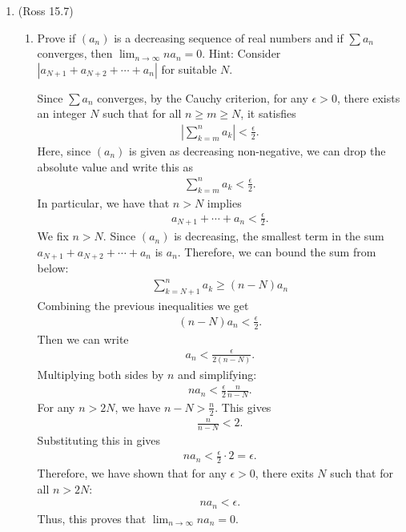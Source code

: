 \documentclass [10pt]{article}
\newcommand{\jg}[1]{{\color{blue} #1}}
\begin{document}
\begin{enumerate}
\begin{enumerate}
{}

\end{enumerate}
\clearpage

\item (Ross 15.7)
\begin{enumerate}
\item Prove if $(a_n)$ is a decreasing sequence of real numbers and if $\sum
a_n$ converges, then $\lim_{n \to \infty} n a_n=0.$ Hint: Consider $|a_{N+1}+a_{N+2}+ \cdots + a_n|$ for suitable $N$.

\jg{
Since $\sum a_n$ converges, by the Cauchy criterion, for any $\epsilon > 0$, there exists an integer $N$ such that for all $n \geq m \geq N$, it satisfies 
\begin{align*}
    \left| \sum_{k=m}^n a_k  \right| < \frac{\epsilon}{2}. 
\end{align*}
Here, since $(a_n)$ is given as decreasing non-negative, we can drop the absolute value and write this as 
\begin{align*}
     \sum_{k=m}^n a_k  < \frac{\epsilon}{2}. 
\end{align*}
In particular, we have that $n > N$ implies 
\begin{align*}
    a_{N+1} + \cdots + a_n < \frac{\epsilon}{2}.
\end{align*}
We fix $n>N$. Since $(a_n)$ is decreasing, the smallest term in the sum $a_{N+1}+a_{N+2}+ \cdots + a_n$ is $a_n$. Therefore, we can bound the sum from below: 
\begin{align*}
    \sum_{k=N+1}^n a_k \geq (n-N)a_n
\end{align*}
Combining the previous inequalities we get
\begin{align*}
    (n-N)a_n < \frac{\epsilon}{2}. 
\end{align*}
Then we can write 
\begin{align*}
    a_n < \frac{\epsilon}{2(n-N)}.
\end{align*}
Multiplying both sides by $n$ and simplifying: 
\begin{align*}
    n a_n < \frac{\epsilon}{2} \frac{n}{n-N}. 
\end{align*}
For any $n > 2N$, we have $n - N > \frac{n}{2}$. This gives  
\begin{align*}
    \frac{n}{n-N} < 2.
\end{align*}
Substituting this in gives
\begin{align*}
    n a_n < \frac{\epsilon}{2} \cdot 2 = \epsilon.
\end{align*}
Therefore, we have shown that for any $\epsilon > 0$, there exits $N$ such that for all $n > 2N$: 
\begin{align*}
    n a_n < \epsilon.
\end{align*}
Thus, this proves that $\lim_{n \rightarrow \infty} n a_n = 0$. 
}


\end{enumerate}
\end{enumerate}
\end{document}
